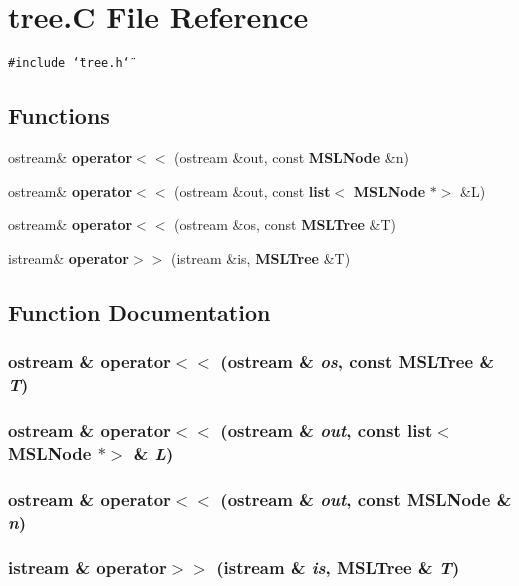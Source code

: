 \section{tree.C File Reference}
\label{tree_8C}
{\tt \#include \char`\"{}tree.h\char`\"{}}\par
\subsection*{Functions}
\begin{CompactItemize}
\item 
ostream\& {\bf operator$<$$<$} (ostream \&out, const {\bf MSLNode} \&n)
\item 
ostream\& {\bf operator$<$$<$} (ostream \&out, const {\bf list}$<$ {\bf MSLNode} $\ast$$>$ \&L)
\item 
ostream\& {\bf operator$<$$<$} (ostream \&os, const {\bf MSLTree} \&T)
\item 
istream\& {\bf operator$>$$>$} (istream \&is, {\bf MSLTree} \&T)
\end{CompactItemize}


\subsection{Function Documentation}
\subsubsection{\setlength{\rightskip}{0pt plus 5cm}ostream \& operator$<$$<$ (ostream \& {\em os}, const {\bf MSLTree} \& {\em T})}\label{tree_8C_a2}


\subsubsection{\setlength{\rightskip}{0pt plus 5cm}ostream \& operator$<$$<$ (ostream \& {\em out}, const {\bf list}$<$ {\bf MSLNode} $\ast$$>$ \& {\em L})}\label{tree_8C_a1}


\subsubsection{\setlength{\rightskip}{0pt plus 5cm}ostream \& operator$<$$<$ (ostream \& {\em out}, const {\bf MSLNode} \& {\em n})}\label{tree_8C_a0}


\subsubsection{\setlength{\rightskip}{0pt plus 5cm}istream \& operator$>$$>$ (istream \& {\em is}, {\bf MSLTree} \& {\em T})}\label{tree_8C_a3}


